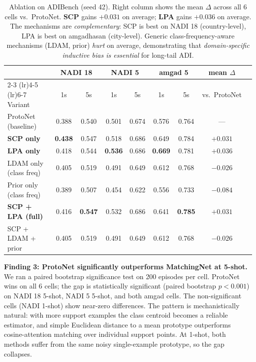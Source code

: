 \documentclass[11pt,a4paper,twocolumn]{article}
\newcommand{\bench}{ADIBench}
\begin{document}
\begin{table}[t]
\centering\small
\begin{tabular}{lcccccccc}
\toprule
& \multicolumn{2}{c}{NADI 18} & \multicolumn{2}{c}{NADI 5} & \multicolumn{2}{c}{amgad 5} & mean $\Delta$ \\
\cmidrule(lr){2-3} \cmidrule(lr){4-5} \cmidrule(lr){6-7}
Variant & 1s & 5s & 1s & 5s & 1s & 5s & vs.\ ProtoNet \\
\midrule
ProtoNet (baseline) & 0.388 & 0.540 & 0.501 & 0.674 & 0.576 & 0.764 & --- \\
\midrule
\textbf{SCP only} & \textbf{0.438} & 0.547 & 0.518 & 0.686 & 0.649 & 0.784 & $+0.031$ \\
\textbf{LPA only} & 0.418 & 0.544 & \textbf{0.536} & 0.686 & \textbf{0.669} & 0.781 & $+0.036$ \\
LDAM only (class freq) & 0.405 & 0.519 & 0.491 & 0.649 & 0.612 & 0.768 & $-0.026$ \\
Prior only (class freq) & 0.389 & 0.507 & 0.454 & 0.622 & 0.556 & 0.733 & $-0.084$ \\
\midrule
\textbf{SCP + LPA (full)} & 0.416 & \textbf{0.547} & 0.532 & 0.686 & 0.641 & \textbf{0.785} & $+0.031$ \\
SCP + LDAM + prior & 0.405 & 0.519 & 0.491 & 0.649 & 0.612 & 0.768 & $-0.026$ \\
\bottomrule
\end{tabular}
\caption{Ablation on \bench{} (seed 42). Right column shows
the mean $\Delta$ across all 6 cells vs.\ ProtoNet.
\textbf{SCP} gains $+0.031$ on average; \textbf{LPA} gains $+0.036$
on average. The mechanisms are \emph{complementary}: SCP is best
on NADI 18 (country-level), LPA is best on amgadhasan
(city-level). Generic class-frequency-aware mechanisms (LDAM,
prior) \emph{hurt} on average, demonstrating that
\emph{domain-specific inductive bias is essential} for long-tail
ADI.}
\label{tab:ablation}
\end{table}

\textbf{Finding 3: ProtoNet significantly outperforms
MatchingNet at 5-shot.} We ran a paired bootstrap significance
test on 200 episodes per cell. ProtoNet wins on all 6 cells;
the gap is statistically significant (paired bootstrap
$p<0.001$) on NADI 18 5-shot, NADI 5 5-shot, and both amgad
cells. The non-significant cells (NADI 1-shot) show near-zero
differences. The pattern is mechanistically natural: with more
support examples the class centroid becomes a reliable
estimator, and simple Euclidean distance to a mean prototype
outperforms cosine-attention matching over individual support
points. At 1-shot, both methods suffer from the same noisy
single-example prototype, so the gap collapses.
\end{document}

